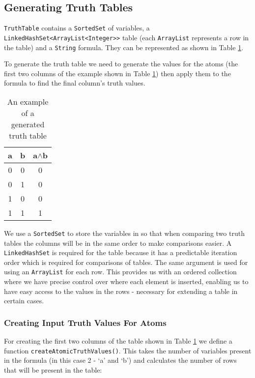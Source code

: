\documentclass{report}
\begin{document}
\subsection{Generating Truth Tables}

{\tt TruthTable} contains a {\tt SortedSet} of variables, a {\tt LinkedHashSet<ArrayList<Integer>>} table (each {\tt ArrayList} represents a row in the table) and a {\tt String} formula. They can be represented as shown in Table \ref{table:generated_truth_table}. 

To generate the truth table we need to generate the values for the atoms (the first two columns of the example shown in Table \ref{table:generated_truth_table}) then apply them to the formula to find the final column's truth values.

\begin{table}[h]
  \begin{center}
    \begin{tabular}{ || c | c || c || }
      \hline
      a & b & a$\land$b \\ \hline
      0 & 0 & 0 \\
      0 & 1 & 0 \\
      1 & 0 & 0 \\
      1 & 1 & 1 \\
      \hline
    \end{tabular}
  \end{center}
  \caption{An example of a generated truth table}
  \label{table:generated_truth_table}
\end{table}

We use a {\tt SortedSet} to store the variables in so that when comparing two truth tables the columns will be in the same order to make comparisons easier. A {\tt LinkedHashSet} is required for the table because it has a predictable iteration order which is required for comparisons of tables. The same argument is used for using an {\tt ArrayList} for each row. This provides us with an ordered collection where we have precise control over where each element is inserted, enabling us to have easy access to the values in the rows - necessary for extending a table in certain cases.

\subsubsection{Creating Input Truth Values For Atoms}

For creating the first two columns of the table shown in Table \ref{table:generated_truth_table} we define a function {\tt createAtomicTruthValues()}. This takes the number of variables present in the formula (in this case 2 - `a' and `b') and calculates the number of rows that will be present in the table:
\end{document}
